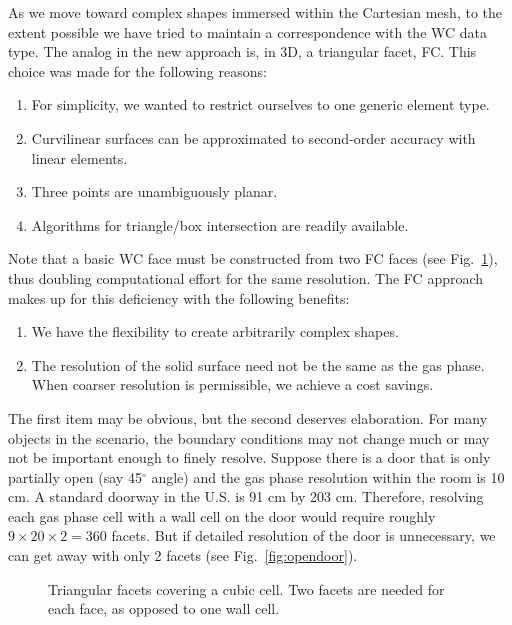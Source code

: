 \documentclass[12pt]{article}
\begin{document}
As we move toward complex shapes immersed within the Cartesian mesh, to the extent possible we have tried to maintain a correspondence with the WC data type.  The analog in the new approach is, in 3D, a triangular facet, FC. This choice was made for the following reasons:
\begin{enumerate}[{\,\,\,\,(}a{)}]
\item For simplicity, we wanted to restrict ourselves to one generic element type.
\item Curvilinear surfaces can be approximated to second-order accuracy with linear elements.
\item Three points are unambiguously planar.
\item Algorithms for triangle/box intersection are readily available.
\end{enumerate}

Note that a basic WC face must be constructed from two FC faces (see Fig.~\ref{fig:facetcell}), thus doubling computational effort for the same resolution.  The FC approach makes up for this deficiency with the following benefits:
\begin{enumerate}[{(}i{)}]
\item We have the flexibility to create arbitrarily complex shapes.
\item The resolution of the solid surface need not be the same as the gas phase.  When coarser resolution is permissible, we achieve a cost savings.
\end{enumerate}

The first item may be obvious, but the second deserves elaboration. For many objects in the scenario, the boundary conditions may not change much or may not be important enough to finely resolve.  Suppose there is a door that is only partially open (say 45$^\circ$ angle) and the gas phase resolution within the room is 10 cm.  A standard doorway in the U.S. is 91 cm by 203 cm.  Therefore, resolving each gas phase cell with a wall cell on the door would require roughly $9 \times 20 \times 2 = 360$ facets.  But if detailed resolution of the door is unnecessary, we can get away with only 2 facets (see Fig.~\ref{fig:opendoor}).

\begin{figure}
\begin{center}

\caption{Triangular facets covering a cubic cell.  Two facets are needed for each face, as opposed to one wall cell.}
\label{fig:facetcell}
\end{center}
\end{figure}
\end{document}
